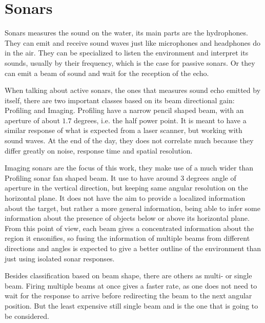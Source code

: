 
\section{Sonars}

Sonars measures the sound on the water, its main parts are the hydrophones. They
can emit and receive sound waves just like microphones and headphones do in the
air. They can be specialized to listen the environment and interpret its sounds,
usually by their frequency, which is the case for passive sonars. Or they can
emit a beam of sound and wait for the reception of the echo.

 When talking about active sonars, the ones that measures sound echo emitted
by itself, there are two important classes based on its beam directional gain:
Profiling and Imaging.
Profiling have a narrow pencil shaped beam, with an aperture of about $1.7$
degrees, i.e. the half power point. It is meant to have a similar response of
what is expected from a laser scanner, but working with sound waves. At the end
of the day, they does not correlate much because they differ greatly on noise,
response time and spatial resolution.

Imaging sonars are the focus of this work, they make use of a much wider than
Profiling sonar fan shaped beam. It use to have around $3$ degrees angle of
aperture in the vertical direction, but keeping same angular resolution on the
horizontal plane.
It does not have the aim to provide a localized information about the target,
but rather a more general information, being able to infer some information
about the presence of objects below or above its horizontal plane. From this
point of view, each beam gives a concentrated information about the region it
ensonifies, so fusing the information of multiple beams from different
directions and angles is expected to give a better outline of the environment
than just using isolated sonar responses.

Besides classification based on beam shape, there are others as multi- or single
beam. Firing multiple beams at once gives a faster rate, as one does not need to
wait for the response to arrive before redirecting the beam to the next angular
position. But the least expensive still single beam and is the one that is going
to be considered.
